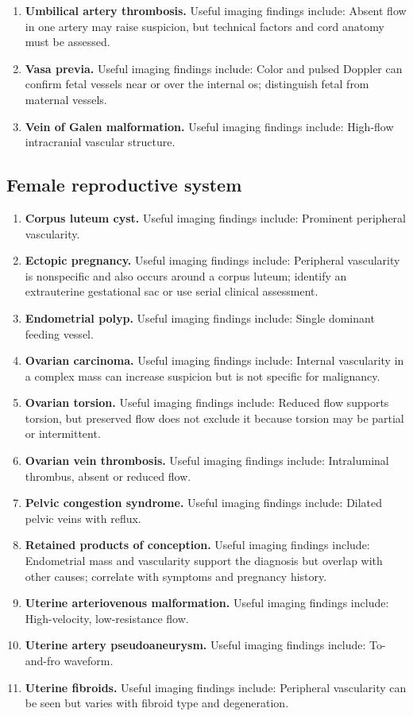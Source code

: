 \begin{enumerate}[leftmargin=*,itemsep=0.45em,topsep=0.4em]
\item \textbf{Umbilical artery thrombosis.} Useful imaging findings include: Absent flow in one artery may raise suspicion, but technical factors and cord anatomy must be assessed.
\item \textbf{Vasa previa.} Useful imaging findings include: Color and pulsed Doppler can confirm fetal vessels near or over the internal os; distinguish fetal from maternal vessels.
\item \textbf{Vein of Galen malformation.} Useful imaging findings include: High-flow intracranial vascular structure.
\end{enumerate}

\subsection{Female reproductive system}
\begin{enumerate}[leftmargin=*,itemsep=0.45em,topsep=0.4em]
\item \textbf{Corpus luteum cyst.} Useful imaging findings include: Prominent peripheral vascularity.
\item \textbf{Ectopic pregnancy.} Useful imaging findings include: Peripheral vascularity is nonspecific and also occurs around a corpus luteum; identify an extrauterine gestational sac or use serial clinical assessment.
\item \textbf{Endometrial polyp.} Useful imaging findings include: Single dominant feeding vessel.
\item \textbf{Ovarian carcinoma.} Useful imaging findings include: Internal vascularity in a complex mass can increase suspicion but is not specific for malignancy.
\item \textbf{Ovarian torsion.} Useful imaging findings include: Reduced flow supports torsion, but preserved flow does not exclude it because torsion may be partial or intermittent.
\item \textbf{Ovarian vein thrombosis.} Useful imaging findings include: Intraluminal thrombus, absent or reduced flow.
\item \textbf{Pelvic congestion syndrome.} Useful imaging findings include: Dilated pelvic veins with reflux.
\item \textbf{Retained products of conception.} Useful imaging findings include: Endometrial mass and vascularity support the diagnosis but overlap with other causes; correlate with symptoms and pregnancy history.
\item \textbf{Uterine arteriovenous malformation.} Useful imaging findings include: High-velocity, low-resistance flow.
\item \textbf{Uterine artery pseudoaneurysm.} Useful imaging findings include: To-and-fro waveform.
\item \textbf{Uterine fibroids.} Useful imaging findings include: Peripheral vascularity can be seen but varies with fibroid type and degeneration.
\end{enumerate}

